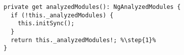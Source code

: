 \begin{verbatim}
  private get analyzedModules(): NgAnalyzedModules {
    if (!this._analyzedModules) {
      this.initSync();
    }
    return this._analyzedModules!; %\step{1}%
  }
\end{verbatim}
